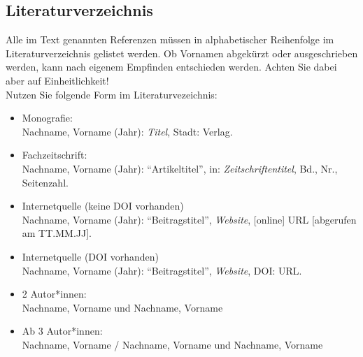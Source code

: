 \subsection{Literaturverzeichnis}
Alle im Text genannten Referenzen müssen in alphabetischer Reihenfolge im Literaturverzeichnis gelistet werden. Ob Vornamen abgekürzt oder ausgeschrieben werden, kann nach eigenem Empfinden entschieden werden. Achten Sie dabei aber auf Einheitlichkeit!\\
Nutzen Sie folgende Form im Literaturvezeichnis:
\begin{itemize}
    \item Monografie:\\Nachname, Vorname (Jahr): \textit{Titel}, Stadt: Verlag.
    \item Fachzeitschrift:\\Nachname, Vorname (Jahr): “Artikeltitel”, in: \textit{Zeitschriftentitel}, Bd., Nr., Seitenzahl.
    \item Internetquelle (keine DOI vorhanden)\\Nachname, Vorname (Jahr): “Beitragstitel”, \textit{Website}, [online] URL [abgerufen am TT.MM.JJ].
    \item Internetquelle (DOI vorhanden)\\ Nachname, Vorname (Jahr): “Beitragstitel”, \textit{Website}, DOI: URL.
    \item 2 Autor*innen:\\ Nachname, Vorname und Nachname, Vorname
    \item Ab 3 Autor*innen:\\Nachname, Vorname / Nachname, Vorname und Nachname, Vorname

    \end{itemize}